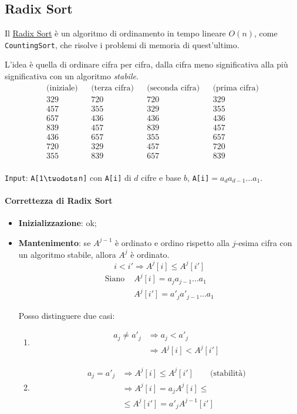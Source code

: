 \subsection{Radix Sort}
Il \href{https://en.wikipedia.org/wiki/Radix_sort}{Radix Sort} è un algoritmo di ordinamento in tempo
lineare $O(n)$, come \texttt{CountingSort}, che risolve i problemi di memoria di quest'ultimo.

L'idea è quella di ordinare cifra per cifra, dalla cifra meno significativa alla più significativa con un 
algoritmo \emph{stabile}.
\begin{align*}
	\text{(iniziale)} && \text{(terza cifra)} && \text{(seconda cifra)} && \text{(prima cifra)} \\
	329 && 720 && 720 && 329 \\
	457 && 355 && 329 && 355 \\
	657 && 436 && 436 && 436 \\
	839 && 457 && 839 && 457 \\
	436 && 657 && 355 && 657 \\
	720 && 329 && 457 && 720 \\
	355 && 839 && 657 && 839 \\
\end{align*}

\texttt{Input}: \texttt{A[1$\twodots$n]} con \texttt{A[i]} di $d$ cifre e base $b$,
\texttt{A[i]}$= a_d a_{d-1}\dots a_1$.



\paragraph{Correttezza di Radix Sort}
\begin{itemize}
	\item \textbf{Inizializzazione}: ok;
	\item \textbf{Mantenimento}: se $A^{j-1}$ è ordinato e ordino rispetto alla $j$-esima cifra con
	un algoritmo stabile, allora $A^j$ è ordinato.
	$$i < i' \Rightarrow A^j[i] \leq A^j[i']$$
	\begin{align*}
		\text{Siano } & A^j[i] = a_j a_{j-1} \dots a_1 \\
		& A^j[i'] = a'_j a'_{j-1} \dots a_1
	\end{align*}
	
	Posso distinguere due casi:
	\begin{enumerate}
		\item \begin{align*}
			a_j \neq a'_j & \Rightarrow a_j < a'_j \\
			& \Rightarrow A^j[i] < A^j[i']
		\end{align*}
		\item \begin{align*}
			a_j = a'_j & \Rightarrow A^j[i] \leq A^j[i'] \qquad \text{(stabilità)}\\
			& \Rightarrow A^j[i] = a_j A^j[i] \leq \\
			& \leq A^j[i'] = a'_j A^{j-1}[i']
		\end{align*}
	\end{enumerate}
\end{itemize}

